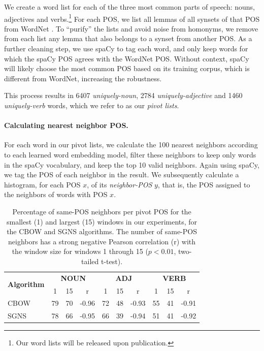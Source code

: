 \documentclass[11pt,a4paper]{article}
\begin{document}
    We create a word list for each of the three most
    common parts of speech:
    nouns, adjectives and verbs.\footnote{Our word lists will be released upon publication.}
    For each POS, we list all lemmas of all synsets of that POS from
    WordNet \cite{miller1998wordnet}.
    To ``purify'' the lists and avoid noise from homonyms,
    we remove from each list any lemma that also belongs to a synset from
    another POS.
    As a further cleaning step, we use spaCy to tag each word,
    and only keep words for which the spaCy POS agrees with the WordNet POS.
    Without context, spaCy will likely choose the most
    common POS based on its training corpus, which is different from WordNet,
    increasing the robustness.
    
    This process results in 6407 \textit{uniquely-noun}, 2784 \textit{uniquely-adjective}
    and 1460 \textit{uniquely-verb} words, which we refer to as our \textit{pivot lists}.
    
    \paragraph{Calculating nearest neighbor POS.}
    
    For each word in our pivot lists, we calculate the 100 nearest neighbors
    according to each learned word embedding model, filter these neighbors to
    keep only words in the spaCy vocabulary, and keep the top 10 valid neighbors.
    Again using spaCy, we tag the POS of each neighbor in the result.
    We subsequently calculate a histogram, for each POS $x$, of its
    \textit{neighbor-POS} $y$, that is, the POS assigned to the neighbors of
    words with POS $x$.
    
    \begin{table}[t]
    \centering
    \small
    \setlength\tabcolsep{3.5pt}
    \def\arraystretch{1.125}
    \begin{tabular}{l|ccc|ccc|ccc}
    \multirow{2}{1cm}{\normalsize \bf Algorithm}
    & \multicolumn{3}{c|}{\normalsize \bf NOUN} & \multicolumn{3}{c|}{\normalsize \bf ADJ} & \multicolumn{3}{c}{\normalsize \bf VERB} \\
    & \normalsize 1 & \normalsize 15 & \normalsize r & \normalsize 1 & \normalsize 15 & \normalsize r & \normalsize 1 & \normalsize 15 & \normalsize r \\
    \hline
    \normalsize CBOW & 79 & 70 & -0.96 & 72 & 48 & -0.93 & 55 & 41 & -0.91 \\
    \normalsize SGNS & 78 & 66 & -0.95 & 66 & 39 & -0.94 & 51 & 41 & -0.92 
    \end{tabular}
    \caption{Percentage of same-POS neighbors per pivot POS for the smallest (1) and largest (15)
        windows in our experiments, for the CBOW and SGNS algorithms.
        The number of same-POS neighbors has a strong negative Pearson correlation (r) with the window size
        for windows 1 through 15 ($p<0.01$, two-tailed t-test).
    \label{tab:nn_pos_hist}}
    \end{table}
    
\end{document}
